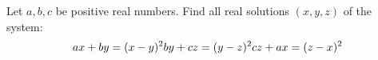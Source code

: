 Let $a,b,c$ be positive real numbers. Find all real solutions $(x,y,z)$ of the system:\[ ax+by=(x-y)^{2}

\\ by+cz=(y-z)^{2}

\\ cz+ax=(z-x)^{2}\]